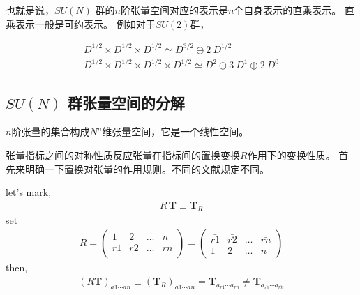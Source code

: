 也就是说，$SU(N)$ 群的$n$阶张量空间对应的表示是$n$个自身表示的直乘表示。
直乘表示一般是可约表示。
例如对于$SU(2)$群，

\begin{example}[SU(2)]
\begin{equation}\begin{aligned}
\label{eq.8.1.3}
D^{1/2}\times D^{1/2}\times D^{1/2}\simeq D^{3/2} \oplus 2 ~ D^{1/2} \\
D^{1/2}\times D^{1/2}\times D^{1/2}\times D^{1/2}\simeq D^{2} \oplus 3~D^{1} \oplus 2~D^{0}
\end{aligned}\end{equation}
\end{example}

\subsection{ \texorpdfstring{$SU(N)$}{Lg} 群张量空间的分解}

$n$阶张量的集合构成$N^n$维张量空间，它是一个线性空间。

张量指标之间的对称性质反应张量在指标间的置换变换$R$作用下的变换性质。
首先来明确一下置换对张量的作用规则。不同的文献规定不同。

\begin{newprop}
let's mark,
\begin{equation}\begin{aligned}
		\label{eq.8.1.4}
	R\,\mathbf{T}\equiv \mathbf{T}_R
\end{aligned}\end{equation}
set
\begin{equation}\begin{aligned}
\label{eq.8.1.5}
R=
\begin{pmatrix}
1&2&\ldots&n\\
r1&r2&\ldots&rn\\
\end{pmatrix}
=
\begin{pmatrix}
\bar{r1}&\bar{r2}&\ldots&\bar{rn}\\
1&2&\ldots&n
\end{pmatrix}
\end{aligned}\end{equation}
then,
\begin{equation}\begin{aligned}
(R\mathbf{T})_{a1\cdots an}\equiv (\mathbf{T}_R)_{a1\cdots an}=
\mathbf{T}_{a_{r1}\cdots a_{rn}}
\neq
\mathbf{T}_{a_{\bar{r1}}\cdots a_{\bar{rn}}}
\end{aligned}\end{equation}
\end{newprop}

